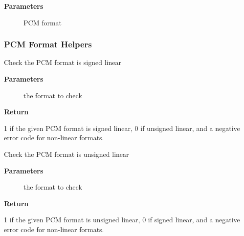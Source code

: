 \documentclass[a4paper,8pt,english]{sphinxmanual}
\begin{document}
\textbf{Parameters}
\begin{description}
\item[{}] \leavevmode
PCM format

\end{description}


\subsubsection{PCM Format Helpers}
\label{sound/kernel-api/alsa-driver-api:pcm-format-helpers}

\begin{fulllineitems}
\label{sound/kernel-api/alsa-driver-api:c.snd_pcm_format_signed}
Check the PCM format is signed linear

\end{fulllineitems}


\textbf{Parameters}
\begin{description}
\item[{}] \leavevmode
the format to check

\end{description}

\textbf{Return}

1 if the given PCM format is signed linear, 0 if unsigned
linear, and a negative error code for non-linear formats.

\begin{fulllineitems}
\label{sound/kernel-api/alsa-driver-api:c.snd_pcm_format_unsigned}
Check the PCM format is unsigned linear

\end{fulllineitems}


\textbf{Parameters}
\begin{description}
\item[{}] \leavevmode
the format to check

\end{description}

\textbf{Return}

1 if the given PCM format is unsigned linear, 0 if signed
linear, and a negative error code for non-linear formats.
\end{document}
